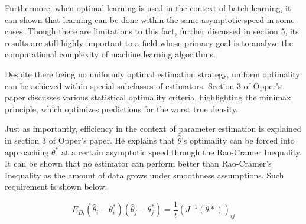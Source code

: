 																																																																																																																																			    \noindent Furthermore, when optimal learning is used in the context of batch learning, it can shown that learning can be done within the same asymptotic speed in some cases. Though there are limitations to this fact, further discussed in section 5, its results are still highly important to a field whose primary goal is to analyze the computational complexity of machine learning algorithms. \vspace{4mm}
																																																																																																																																				    
																																																																																																																																					    \noindent Despite there being no uniformly optimal estimation strategy, uniform optimality can be achieved within special subclasses of estimators. Section 3 of Opper's paper discusses various statistical optimality criteria, highlighting the minimax principle, which optimizes predictions for the worst true density. \vspace{4mm}
																																																																																																																																						    
																																																																																																																																							    \noindent Just as importantly, efficiency in the context of parameter estimation is explained in section 3 of Opper's paper. He explains that $\hat \theta$'s optimality can be forced into approaching $\theta^*$ at a certain asymptotic speed through the Rao-Cramer Inequality. It can be shown that no estimator can perform better than Rao-Cramer's Inequality as the amount of data grows under smoothness assumptions. Such requirement is shown below:
																																																																																																																																								    
																																																																																																																																									    $$E_{D_t} (\hat \theta_i - \theta_{i}^*)(\hat \theta_{j} - \theta_{j}^*) = \frac{1}{t}\left(J^{-1}(\theta*)\right)_{ij}$$
																																																																																																																																										    

